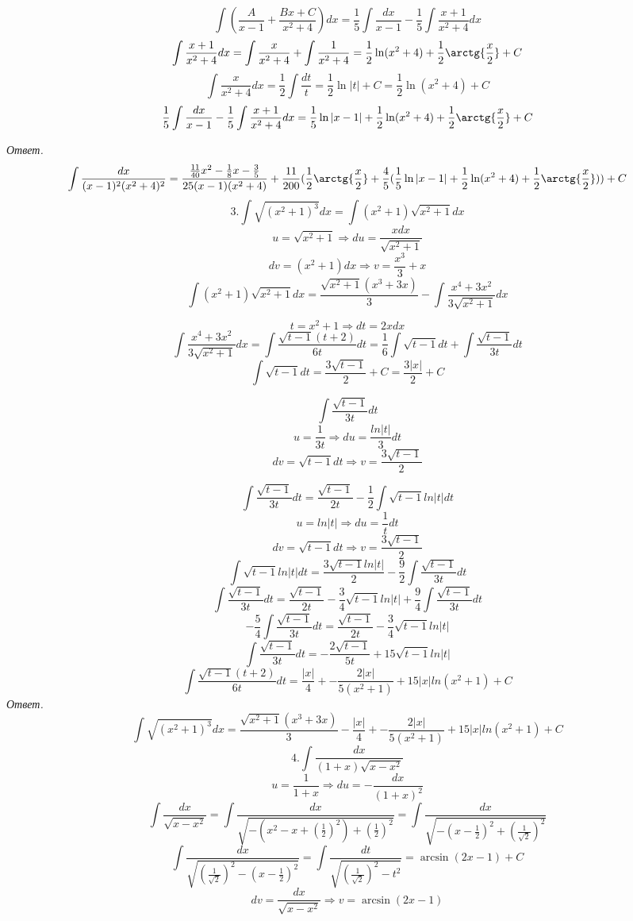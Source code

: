 \documentclass{article}
\begin{document}
	$$\int(\frac{A}{x - 1} + \frac{Bx + C}{x^2 + 4})dx = \frac{1}{5}\int\frac{dx}{x - 1} - \frac{1}{5}\int\frac{x + 1}{x^2 + 4}dx$$
	$$\int\frac{x + 1}{x^2 + 4}dx = \int\frac{x}{x^2+4} + \int\frac{1}{x^2 + 4} = \frac{1}{2}\ln(x^2 + 4) + \frac{1}{2}\arctg{\frac{x}{2}} + C$$
	$$\int\frac{x}{x^2 + 4}dx = \frac{1}{2}\int\frac{dt}{t} = \frac{1}{2}\ln|t| + C = \frac{1}{2}\ln(x^2 + 4) + C$$
	$$\frac{1}{5}\int\frac{dx}{x - 1} - \frac{1}{5}\int\frac{x + 1}{x^2 + 4}dx = \frac{1}{5}\ln|x - 1| + \frac{1}{2}\ln(x^2 + 4) + \frac{1}{2}\arctg{\frac{x}{2}} + C$$

	\emph{Ответ.} $$\int\frac{dx}{(x-1)^2(x^2+4)^2} = \frac{\frac{11}{40}x^2 - \frac{1}{8}x - \frac{3}{5}}{25(x-1)(x^2+4)} + \frac{11}{200}(\frac{1}{2}\arctg{\frac{x}{2}} + \frac{4}{5}(\frac{1}{5}\ln|x - 1| + \frac{1}{2}\ln(x^2 + 4) + \frac{1}{2}\arctg{\frac{x}{2}})) + C$$
	$$3. \int\sqrt{(x^2+1)^3}dx = \int(x^2 + 1)\sqrt{x^2 + 1}dx$$
	$$u = \sqrt{x^2 + 1} \Rightarrow du = \frac{xdx}{\sqrt{x^2 + 1}}$$
	$$dv = (x^2 + 1)dx \Rightarrow v = \frac{x^3}{3} + x$$
	$$\int(x^2 + 1)\sqrt{x^2 + 1}dx = \frac{\sqrt{x^2 + 1}(x^3 + 3x)}{3} - \int\frac{x^4 + 3x^2}{3\sqrt{x^2 + 1}}dx$$

	$$t = x^2 + 1 \Rightarrow dt = 2xdx$$
	$$\int\frac{x^4 + 3x^2}{3\sqrt{x^2 + 1}}dx = \int\frac{\sqrt{t - 1}(t + 2)}{6t}dt = \frac{1}{6}\int\sqrt{t - 1}dt + \int\frac{\sqrt{t - 1}}{3t}dt$$
	$$\int\sqrt{t - 1}dt = \frac{3\sqrt{t - 1}}{2} + C = \frac{3|x|}{2} + C$$

	$$\int\frac{\sqrt{t - 1}}{3t}dt$$
	$$u = \frac{1}{3t} \Rightarrow du = \frac{ln|t|}{3}dt$$
	$$dv = \sqrt{t - 1}dt \Rightarrow v = \frac{3\sqrt{t - 1}}{2}$$

	$$\int\frac{\sqrt{t - 1}}{3t}dt = \frac{\sqrt{t - 1}}{2t} - \frac{1}{2}\int\sqrt{t - 1}ln|t|dt$$
	$$u = ln|t| \Rightarrow du = \frac{1}{t}dt$$
	$$dv = \sqrt{t - 1}dt \Rightarrow v = \frac{3\sqrt{t - 1}}{2}$$
	$$\int\sqrt{t - 1}ln|t|dt = \frac{3\sqrt{t - 1}ln|t|}{2} - \frac{9}{2}\int\frac{\sqrt{t - 1}}{3t}dt$$
	$$\int\frac{\sqrt{t - 1}}{3t}dt = \frac{\sqrt{t - 1}}{2t} - \frac{3}{4}\sqrt{t - 1}ln|t| + \frac{9}{4}\int\frac{\sqrt{t - 1}}{3t}dt$$
	$$-\frac{5}{4}\int\frac{\sqrt{t - 1}}{3t}dt = \frac{\sqrt{t - 1}}{2t} - \frac{3}{4}\sqrt{t - 1}ln|t|$$
	$$\int\frac{\sqrt{t - 1}}{3t}dt = -\frac{2\sqrt{t - 1}}{5t} + 15\sqrt{t - 1}ln|t|$$
	$$\int\frac{\sqrt{t - 1}(t + 2)}{6t}dt = \frac{|x|}{4} + -\frac{2|x|}{5(x^2 + 1)} + 15|x|ln(x^2 + 1) + C$$
	\emph{Ответ.} $$\int\sqrt{(x^2+1)^3}dx = \frac{\sqrt{x^2 + 1}(x^3 + 3x)}{3} - \frac{|x|}{4} + -\frac{2|x|}{5(x^2 + 1)} + 15|x|ln(x^2 + 1) + C$$
	$$4. \int\frac{dx}{(1+x)\sqrt{x-x^2}}$$
	$$u = \frac{1}{1 + x} \Rightarrow du = -\frac{dx}{(1 + x)^2}$$
	$$\int\frac{dx}{\sqrt{x-x^2}} = \int\frac{dx}{\sqrt{-(x^2 - x + (\frac{1}{2})^2) + (\frac{1}{2})^2}} = \int\frac{dx}{\sqrt{-(x - \frac{1}{2})^2 + (\frac{1}{\sqrt{2}})^2}}$$
	$$\int\frac{dx}{\sqrt{(\frac{1}{\sqrt{2}})^2 - (x - \frac{1}{2})^2}} = \int\frac{dt}{\sqrt{(\frac{1}{\sqrt{2}})^2 - t^2}} = \arcsin(2x - 1) + C$$
	$$dv = \frac{dx}{\sqrt{x-x^2}} \Rightarrow v = \arcsin(2x - 1)$$
\end{document}
